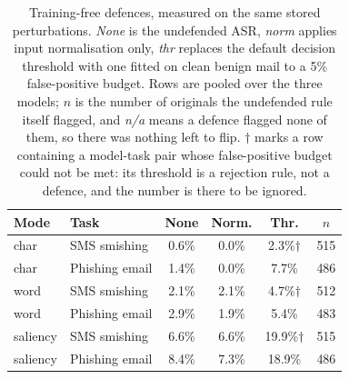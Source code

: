 \begin{table}[t]
\centering
\small
\caption{Training-free defences, measured on the same stored perturbations. \emph{None} is the undefended ASR, \emph{norm} applies input normalisation only, \emph{thr} replaces the default decision threshold with one fitted on clean benign mail to a 5\% false-positive budget. Rows are pooled over the three models; $n$ is the number of originals the undefended rule itself flagged, and \emph{n/a} means a defence flagged none of them, so there was nothing left to flip. $\dagger$ marks a row containing a model-task pair whose false-positive budget could not be met: its threshold is a rejection rule, not a defence, and the number is there to be ignored.}
\label{tab:defense}
\begin{tabular}{llcccc}
\toprule
\textbf{Mode} & \textbf{Task} & \textbf{None} & \textbf{Norm.} & \textbf{Thr.} & \textbf{$n$} \\
\midrule
 char & SMS smishing & 0.6\% & 0.0\% & 2.3\%$\dagger$ & 515 \\
 char & Phishing email & 1.4\% & 0.0\% & 7.7\% & 486 \\
\midrule
 word & SMS smishing & 2.1\% & 2.1\% & 4.7\%$\dagger$ & 512 \\
 word & Phishing email & 2.9\% & 1.9\% & 5.4\% & 483 \\
\midrule
 saliency & SMS smishing & 6.6\% & 6.6\% & 19.9\%$\dagger$ & 515 \\
 saliency & Phishing email & 8.4\% & 7.3\% & 18.9\% & 486 \\
\bottomrule
\end{tabular}
\end{table}
